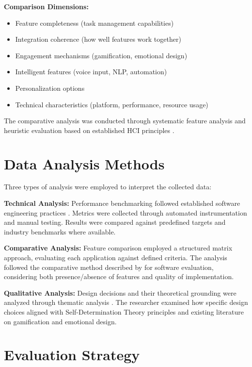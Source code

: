 \textbf{Comparison Dimensions:}
\begin{itemize}
    \item Feature completeness (task management capabilities)
    \item Integration coherence (how well features work together)
    \item Engagement mechanisms (gamification, emotional design)
    \item Intelligent features (voice input, NLP, automation)
    \item Personalization options
    \item Technical characteristics (platform, performance, resource usage)
\end{itemize}

The comparative analysis was conducted through systematic feature analysis and heuristic evaluation based on established HCI principles \citep{nielsen1994enhancing}.

\section{Data Analysis Methods}
\label{sec:data-analysis}

\completed

Three types of analysis were employed to interpret the collected data:

\textbf{Technical Analysis:} Performance benchmarking followed established software engineering practices \citep{jain1991art}. Metrics were collected through automated instrumentation and manual testing. Results were compared against predefined targets and industry benchmarks where available.

\textbf{Comparative Analysis:} Feature comparison employed a structured matrix approach, evaluating each application against defined criteria. The analysis followed the comparative method described by \citet{te2010comparing} for software evaluation, considering both presence/absence of features and quality of implementation.

\textbf{Qualitative Analysis:} Design decisions and their theoretical grounding were analyzed through thematic analysis \citep{braun2006using}. The researcher examined how specific design choices aligned with Self-Determination Theory principles and existing literature on gamification and emotional design.

\section{Evaluation Strategy}
\label{sec:evaluation-strategy}

